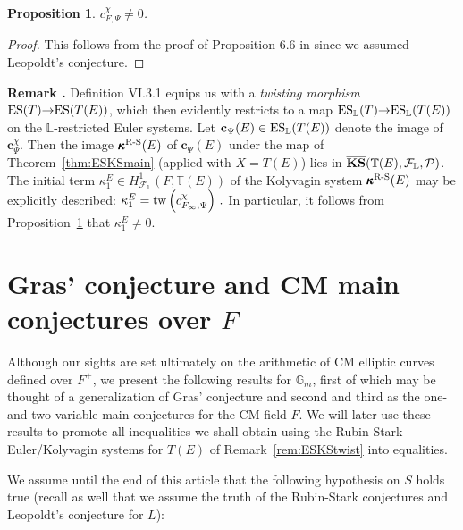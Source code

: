 \documentclass[12pt]{amsart}
\numberwithin{equation}{section}
\newtheorem{prop}[thm]{Proposition}
\newenvironment{rem}{\par\medskip\noindent\refstepcounter{thm}
\bgroup{\hspace*{-0.15 cm}\bf{Remark} \thethm.}\bgroup}{\egroup
\egroup\par\medskip} \parskip 2pt
\begin{document}
\begin{prop}
\label{prop:KSwithnonzeroinitialterm}
$c_{F,\Psi}^\chi\neq 0$.
\end{prop}
\begin{proof}
This follows from the proof of Proposition 6.6 in \cite{ru96} since we assumed Leopoldt's conjecture.
\end{proof}
\begin{rem}
\label{rem:ESKStwist}
Definition VI.3.1 \cite{r00} equips us with a \emph{twisting morphism}  
$\textup{ES}(T){\rightarrow} \textup{ES}(T(E))$, which then evidently restricts to a map $\textup{ES}_{\mathbb{L}}(T){\rightarrow} \textup{ES}_{\mathbb{L}}(T(E))$ on the $\mathbb{L}$-restricted Euler systems. Let $\textbf{c}_{\Psi}(E)\in \textup{ES}_{\mathbb{L}}(T(E))$ denote the image of $\textbf{c}^{\chi}_{\Psi}$. Then the image $\pmb{\kappa}^{\textup{R-S}}(E)$ of $\textbf{c}_{\Psi}(E)$ under the map of Theorem~\ref{thm:ESKSmain} (applied with $X=T(E)$) lies in $\overline{\textbf{\textup{KS}}}({\mathbb{T}}(E),{\mathcal{F}}_{\mathbb{L}},{\mathcal{P}})$. The initial term ${\kappa}^E_1 \in H^1_{{\mathcal{F}}_\mathbb{L}}(F,{\mathbb{T}}(E))$ of the Kolyvagin system $\pmb{\kappa}^{\textup{R-S}}(E)$ may be explicitly described: ${\kappa}^E_1=\textup{tw}\left(c_{F_\infty,\Psi}^\chi\right)\,.$ In particular, it follows from Proposition~\ref{prop:KSwithnonzeroinitialterm} that ${\kappa}^E_1\neq 0$.
\end{rem}
\section{Gras' conjecture and CM main conjectures over $F$}
\label{sec:gras}
Although our sights are set ultimately on the arithmetic of CM elliptic curves defined over $F^+$, we present  the following results for $\mathbb{G}_m$, first of which may be thought of a generalization of Gras' conjecture and second and third as the one- and two-variable main conjectures for the CM field $F$. We will later use these results to promote all inequalities we shall obtain using the Rubin-Stark Euler/Kolyvagin systems for $T(E)$ of Remark~\ref{rem:ESKStwist} into equalities.

We assume until the end of this article that the following hypothesis on $S$ holds true (recall as well that we assume the truth of the Rubin-Stark conjectures and Leopoldt's conjecture for $L$):
\end{document}
